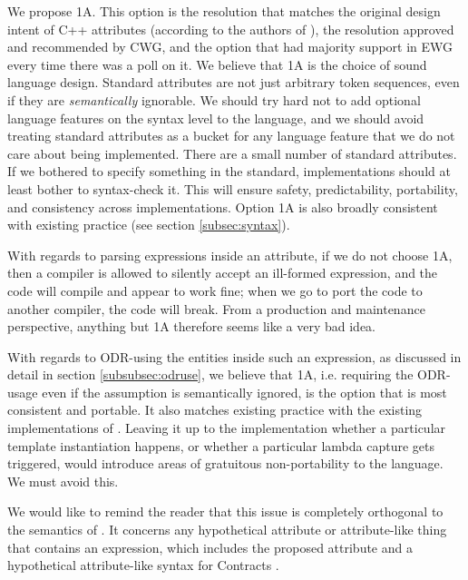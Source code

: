 We propose 1A. This option is the resolution that matches the original design intent of C++ attributes (according to the authors of \cite{N2761}), the resolution approved and recommended by CWG, and the option that had majority support in EWG every time there was a poll on it. We believe that 1A is the choice of sound language design. Standard attributes are not just arbitrary token sequences, even if they are \emph{semantically} ignorable. We should try hard not to add optional language features on the syntax level to the language, and we should avoid treating standard attributes as a bucket for any language feature that we do not care about being implemented. There are a small number of standard attributes. If we bothered to specify something in the standard, implementations should at least bother to syntax-check it. This will ensure safety, predictability, portability, and consistency across implementations. Option 1A is also broadly consistent with existing practice (see section \ref{subsec:syntax}). 

With regards to parsing expressions inside an attribute, if we do not choose 1A, then a compiler is allowed to silently accept an ill-formed expression, and the code will compile and appear to work fine; when we go to port the code to another compiler, the code will break. From a production and maintenance perspective, anything but 1A therefore seems like a very bad idea. 
 
With regards to ODR-using the entities inside such an expression, as discussed in detail in section \ref{subsubsec:odruse}, we believe that 1A, i.e. requiring the ODR-usage even if the assumption is semantically ignored, is the option that is most consistent and portable. It also matches existing practice with the existing implementations of . Leaving it up to the implementation whether a particular template instantiation happens, or whether a particular lambda capture gets triggered, would introduce areas of gratuitous non-portability to the language. We must avoid this. 

We would like to remind the reader that this issue is completely orthogonal to the semantics of . It concerns any hypothetical attribute or attribute-like thing that contains an expression, which includes the proposed  attribute \cite{P1144R5} and a hypothetical attribute-like syntax for Contracts \cite{P2487R0}.
 

